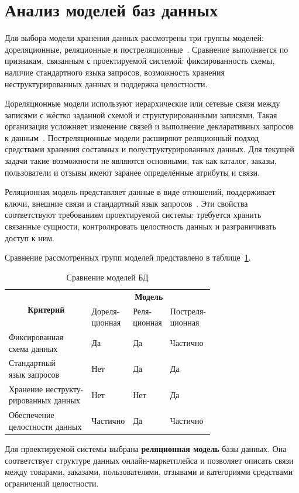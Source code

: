 
\section{Анализ моделей баз данных}

Для выбора модели хранения данных рассмотрены три группы моделей: дореляционные, реляционные и постреляционные~\cite{db_models}. Сравнение выполняется по признакам, связанным с проектируемой системой: фиксированность схемы, наличие стандартного языка запросов, возможность хранения неструктурированных данных и поддержка целостности.

Дореляционные модели используют иерархические или сетевые связи между записями с жёстко заданной схемой и структурированными записями. Такая организация усложняет изменение связей и выполнение декларативных запросов к данным~\cite{db_models}. Постреляционные модели расширяют реляционный подход средствами хранения составных и полуструктурированных данных. Для текущей задачи такие возможности не являются основными, так как каталог, заказы, пользователи и отзывы имеют заранее определённые атрибуты и связи.

Реляционная модель представляет данные в виде отношений, поддерживает ключи, внешние связи и стандартный язык запросов~\cite{db_models, relation_model}. Эти свойства соответствуют требованиям проектируемой системы: требуется хранить связанные сущности, контролировать целостность данных и разграничивать доступ к ним.

Сравнение рассмотренных групп моделей представлено в таблице~\ref{tbl:model_comparison}.

\begin{table}[H]
    \caption{Сравнение моделей БД}
    \label{tbl:model_comparison}
    \centering
    \begin{tabular}{|l|l|l|l|}
        \hline
        \multicolumn{1}{|c|}{\multirow{2}{*}{\textbf{Критерий}}} & \multicolumn{3}{c|}{\textbf{Модель}} \\ \cline{2-4}
        \multicolumn{1}{|c|}{} & \makecell[l]{Дореля-\\ционная} & \makecell[l]{Реля-\\ционная} & \makecell[l]{Постреля-\\ционная} \\ \hline
        \makecell[l]{Фиксированная\\схема данных} & Да & Да & Частично \\ \hline
        \makecell[l]{Стандартный\\язык запросов} & Нет & Да & Да \\ \hline
        \makecell[l]{Хранение неструкту-\\рированных данных} & Нет & Нет & Да \\ \hline
        \makecell[l]{Обеспечение\\целостности данных} & Частично & Да & Частично \\ \hline
    \end{tabular}
\end{table}

Для проектируемой системы выбрана \textbf{реляционная модель} базы данных. Она соответствует структуре данных онлайн-маркетплейса и позволяет описать связи между товарами, заказами, пользователями, отзывами и категориями средствами ограничений целостности.
